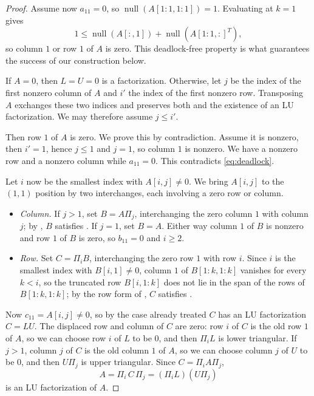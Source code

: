 \documentclass[final]{siamart1116}
\numberwithin{theorem}{section}
\DeclareMathOperator{\nl}{null}
\begin{document}
\begin{proof}
  Assume now $a_{11} = 0$, so $\nl(A[1:1,1:1]) = 1$. Evaluating  at $k = 1$ gives
  \begin{equation}\label{eq:deadlock}
    1 \le \nl(A[:,1]) + \nl({A[1:1,:]}^T),
  \end{equation}
  so column $1$ or row $1$ of $A$ is zero. This deadlock-free property is what guarantees the success of our construction below.

  If $A = 0$, then $L = U = 0$ is a factorization. Otherwise, let $j$ be the index of the first nonzero column of $A$ and $i'$ the index of the first nonzero row. Transposing $A$ exchanges these two indices and preserves both  and the existence of an LU factorization. We may therefore assume $j \le i'$.

  Then row $1$ of $A$ is zero. We prove this by contradiction. Assume it is nonzero, then $i' = 1$, hence $j \le 1$ and $j = 1$, so column $1$ is nonzero. We have a nonzero row and a nonzero column while $a_{11} = 0$. This contradicts \cref{eq:deadlock}.

  Let $i$ now be the smallest index with $A[i,j] \neq 0$. We bring $A[i,j]$ to the $(1,1)$ position by two interchanges, each involving a zero row or column.
  \begin{itemize}
    \item \emph{Column.} If $j > 1$, set $B = A \Pi_j$, interchanging the zero column $1$ with column $j$; by , $B$ satisfies . If $j = 1$, set $B = A$. Either way column $1$ of $B$ is nonzero and row $1$ of $B$ is zero, so $b_{11} = 0$ and $i \ge 2$.
    \item \emph{Row.} Set $C = \Pi_i B$, interchanging the zero row $1$ with row $i$. Since $i$ is the smallest index with $B[i,1] \neq 0$, column $1$ of $B[1:k,1:k]$ vanishes for every $k < i$, so the truncated row $B[i,1:k]$ does not lie in the span of the rows of $B[1:k,1:k]$; by the row form of , $C$ satisfies .
  \end{itemize}
  Now $c_{11} = A[i,j] \neq 0$, so by the case already treated $C$ has an LU factorization $C = LU$. The displaced row and column of $C$ are zero: row $i$ of $C$ is the old row $1$ of $A$, so we can choose row $i$ of $L$ to be $0$, and then $\Pi_i L$ is lower triangular. If $j > 1$, column $j$ of $C$ is the old column $1$ of $A$, so we can choose column $j$ of $U$ to be $0$, and then $U \Pi_j$ is upper triangular. Since $C = \Pi_i A \Pi_j$,
  \[
    A = \Pi_i\, C\, \Pi_j = (\Pi_i L)(U \Pi_j)
  \]
  is an LU factorization of $A$.

\end{proof}
\end{document}
